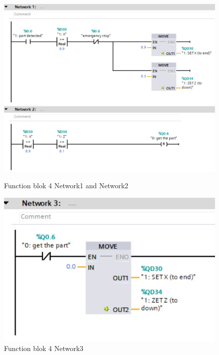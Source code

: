 \begin{figure}[H]
    \centering
    \begin{minipage}{0.45\textwidth}  
        \centering
        \includegraphics[width=\textwidth]{imgs/io/tia6.1.jpg}  
        \caption[Function blok 4 Network1 and Network2]{Function blok 4 Network1 and Network2}
        \label{fig:first}
    \end{minipage} \hfill  
    \begin{minipage}{0.45\textwidth}  
        \centering
        \includegraphics[width=\textwidth]{imgs/io/tia6.2.jpg} 
        \caption[Function blok 4 Network3]{Function blok 4 Network3}
        \label{fig:second}
    \end{minipage}
\end{figure}

